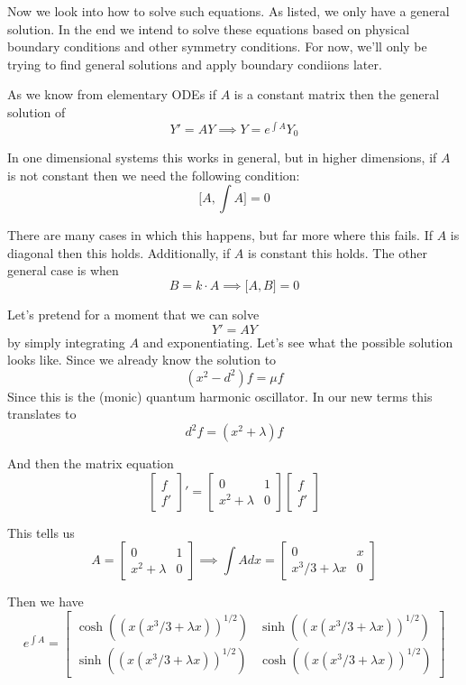 \documentclass{amsart}
\theoremstyle{definition}
\theoremstyle{remark}
\numberwithin{equation}{section}
\begin{document}
Now we look into how to solve such equations.  As listed, we only have a general solution.  In the end we intend to solve these equations based on physical boundary conditions and other symmetry conditions.  For now, we'll only be trying to find general solutions and apply boundary condiions later.

As we know from elementary ODEs if $A$ is a constant matrix then the general solution of 
\[
Y' = AY \implies Y = e^{\int A}Y_0
\]

In one dimensional systems this works in general, but in higher dimensions, if $A$ is not constant then we need the following condition:
\[
\lbrack A, \int A \rbrack = 0
\]

There are many cases in which this happens, but far more where this fails.  If $A$ is diagonal then this holds.  Additionally, if $A$ is constant this holds.  The other general case is when 
\[
B = k\cdot A \implies \lbrack A,B \rbrack = 0
\]


Let's pretend for a moment that we can solve
\[
Y' = AY 
\]
by simply integrating $A$ and exponentiating.  Let's see what the possible solution looks like.  Since we already know the solution to 
\[
(x^2 - d^2)f = \mu f
\]
Since this is the (monic) quantum harmonic oscillator.  In our new terms this translates to
\[
d^2 f = (x^2 + \lambda)f
\] 

And then the matrix equation
\[
\begin{bmatrix}
f \\ f'
\end{bmatrix}'
=\begin{bmatrix}
0 & 1\\ x^2+\lambda & 0
\end{bmatrix}
\begin{bmatrix}
f \\ f'
\end{bmatrix}
\]

This tells us
\[
A = \begin{bmatrix}
0 & 1 \\ x^2+\lambda & 0
\end{bmatrix} \implies
\int A dx = \begin{bmatrix}
0 & x \\ x^3/3 + \lambda x & 0
\end{bmatrix}
\]

Then we have
\[
e^{\int A} = \begin{bmatrix}
\cosh((x(x^3/3+\lambda x))^{1/2}) & \sinh((x(x^3/3+\lambda x))^{1/2})\\
\sinh((x(x^3/3+\lambda x))^{1/2}) & \cosh((x(x^3/3+\lambda x))^{1/2})
\end{bmatrix}
\]
\end{document}

